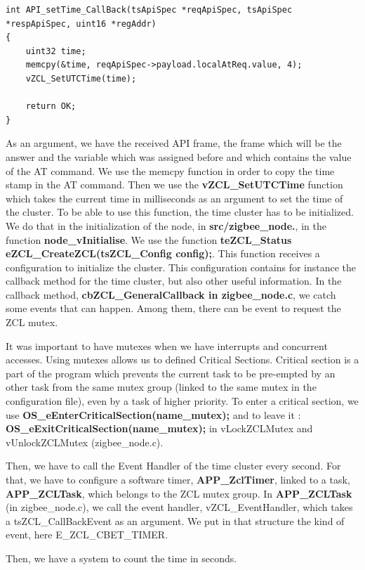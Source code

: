 \begin{lstlisting}[frame=single]
int API_setTime_CallBack(tsApiSpec *reqApiSpec, tsApiSpec *respApiSpec, uint16 *regAddr)
{
    uint32 time;
    memcpy(&time, reqApiSpec->payload.localAtReq.value, 4);
    vZCL_SetUTCTime(time);

    return OK;
}
\end{lstlisting}

As an argument, we have the received API frame, the frame which will be the answer and the variable which was assigned before and which contains the value of the AT command. We use the memcpy function in order to copy the time stamp in the AT command. Then we use the \textbf{vZCL\_SetUTCTime} function which takes the current time in milliseconds as an argument to set the time of the cluster. To be able to use this function, the time cluster has to be initialized. We do that in the initialization of the node, in \textbf{src/zigbee\_node.}, in the function \textbf{node\_vInitialise}. We use the function \textbf{teZCL\_Status eZCL\_CreateZCL(tsZCL\_Config config);}. This function receives a configuration to initialize the cluster. This configuration contains for instance the callback method for the time cluster, but also other useful information. In the callback method, \textbf{cbZCL\_GeneralCallback in zigbee\_node.c}, we catch some events that can happen. Among them, there can be event to request the ZCL mutex.

It was important to have mutexes when we have interrupts and concurrent accesses. Using mutexes allows us to defined Critical Sections. Critical section is a part of the program which prevents the current task to be pre-empted by an other task from the same mutex group (linked to the same mutex in the configuration file), even by a task of higher priority. To enter a critical section, we use \textbf{OS\_eEnterCriticalSection(name\_mutex);} and to leave it : \textbf{OS\_eExitCriticalSection(name\_mutex);} in vLockZCLMutex and vUnlockZCLMutex (zigbee\_node.c).

Then, we have to call the Event Handler of the time cluster every second. For that, we have to configure a software timer, \textbf{APP\_ZclTimer}, linked to a task, \textbf{APP\_ZCLTask}, which belongs to the ZCL mutex group. In \textbf{APP\_ZCLTask} (in zigbee\_node.c), we call the event handler, vZCL\_EventHandler, which takes a tsZCL\_CallBackEvent as an argument. We put in that structure the kind of event, here E\_ZCL\_CBET\_TIMER.

Then, we have a system to count the time in seconds.

